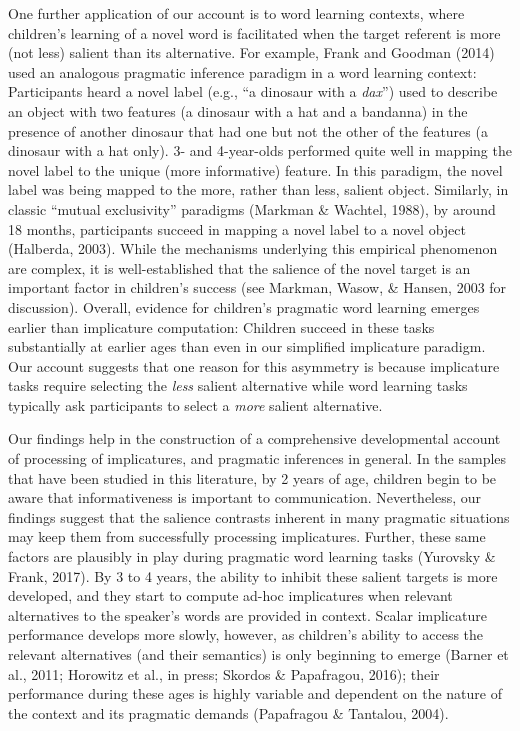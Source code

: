 \documentclass[mask,man]{apa6}
\theoremstyle{definition}
\theoremstyle{definition}
\theoremstyle{definition}
\theoremstyle{remark}
\begin{document}
One further application of our account is to word learning contexts,
where children's learning of a novel word is facilitated when the target
referent is more (not less) salient than its alternative. For example,
Frank and Goodman (2014) used an analogous pragmatic inference paradigm
in a word learning context: Participants heard a novel label (e.g.,
\enquote{a dinosaur with a \emph{dax}}) used to describe an object with
two features (a dinosaur with a hat and a bandanna) in the presence of
another dinosaur that had one but not the other of the features (a
dinosaur with a hat only). 3- and 4-year-olds performed quite well in
mapping the novel label to the unique (more informative) feature. In
this paradigm, the novel label was being mapped to the more, rather than
less, salient object. Similarly, in classic \enquote{mutual exclusivity}
paradigms (Markman \& Wachtel, 1988), by around 18 months, participants
succeed in mapping a novel label to a novel object (Halberda, 2003).
While the mechanisms underlying this empirical phenomenon are complex,
it is well-established that the salience of the novel target is an
important factor in children's success (see Markman, Wasow, \& Hansen,
2003 for discussion). Overall, evidence for children's pragmatic word
learning emerges earlier than implicature computation: Children succeed
in these tasks substantially at earlier ages than even in our simplified
implicature paradigm. Our account suggests that one reason for this
asymmetry is because implicature tasks require selecting the \emph{less}
salient alternative while word learning tasks typically ask participants
to select a \emph{more} salient alternative.

Our findings help in the construction of a comprehensive developmental
account of processing of implicatures, and pragmatic inferences in
general. In the samples that have been studied in this literature, by 2
years of age, children begin to be aware that informativeness is
important to communication. Nevertheless, our findings suggest that the
salience contrasts inherent in many pragmatic situations may keep them
from successfully processing implicatures. Further, these same factors
are plausibly in play during pragmatic word learning tasks (Yurovsky \&
Frank, 2017). By 3 to 4 years, the ability to inhibit these salient
targets is more developed, and they start to compute ad-hoc implicatures
when relevant alternatives to the speaker's words are provided in
context. Scalar implicature performance develops more slowly, however,
as children's ability to access the relevant alternatives (and their
semantics) is only beginning to emerge (Barner et al., 2011; Horowitz et
al., in press; Skordos \& Papafragou, 2016); their performance during
these ages is highly variable and dependent on the nature of the context
and its pragmatic demands (Papafragou \& Tantalou, 2004).
\end{document}
